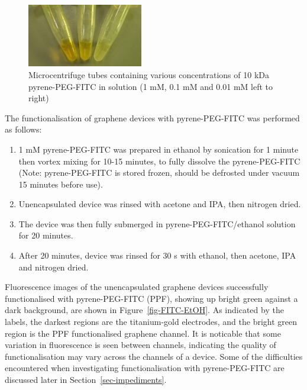 \documentclass[
  a4paper,
]{scrbook}
\begin{document}
\begin{figure}

{\centering \includegraphics[width=0.45\textwidth,height=\textheight]{figures/ch6/PPF_vials.png}

}

\caption{\label{fig-PPF-concs}Microcentrifuge tubes containing various
concentrations of 10 kDa pyrene-PEG-FITC in solution (1 mM, 0.1 mM and
0.01 mM left to right)}

\end{figure}

The functionalisation of graphene devices with pyrene-PEG-FITC was
performed as follows:

\begin{enumerate}
\def\labelenumi{\arabic{enumi}.}
\item
  1 mM pyrene-PEG-FITC was prepared in ethanol by sonication for 1
  minute then vortex mixing for 10-15 minutes, to fully dissolve the
  pyrene-PEG-FITC (Note: pyrene-PEG-FITC is stored frozen, should be
  defrosted under vacuum 15 minutes before use).
\item
  Unencapsulated device was rinsed with acetone and IPA, then nitrogen
  dried.
\item
  The device was then fully submerged in pyrene-PEG-FITC/ethanol
  solution for 20 minutes.
\item
  After 20 minutes, device was rinsed for 30 s with ethanol, then
  acetone, IPA and nitrogen dried.
\end{enumerate}

Fluorescence images of the unencapsulated graphene devices successfully
functionalised with pyrene-PEG-FITC (PPF), showing up bright green
against a dark background, are shown in Figure~\ref{fig-FITC-EtOH}. As
indicated by the labels, the darkest regions are the titanium-gold
electrodes, and the bright green region is the PPF functionalised
graphene channel. It is noticable that some variation in fluorescence is
seen between channels, indicating the quality of functionalisation may
vary across the channels of a device. Some of the difficulties
encountered when investigating functionalisation with pyrene-PEG-FITC
are discussed later in Section~\ref{sec-impediments}.
\end{document}
